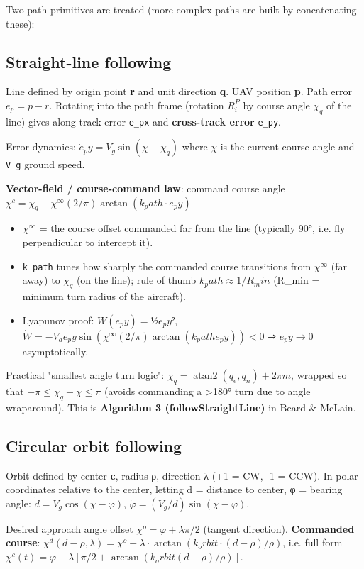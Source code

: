 \documentclass[11pt]{article}
\begin{document}
Two path primitives are treated (more complex paths are built by concatenating these):

\subsection{Straight-line following}
Line defined by origin point \textbf{r} and unit direction \textbf{q}. UAV position \textbf{p}. Path error $e_p = p - r$. Rotating into the path frame (rotation $R_i^P$ by course angle $χ_q$ of the line) gives along-track error \texttt{e\_\allowbreak{}px} and \textbf{cross-track error} \texttt{e\_\allowbreak{}py}.

Error dynamics: $\dot{e}_py = V_g \sin(χ - χ_q)$ where $χ$ is the current course angle and \texttt{V\_\allowbreak{}g} ground speed.

\textbf{Vector-field / course-command law}: command course angle
$χ^c = χ_q - χ^∞ (2/π) \arctan(k_path · e_py)$
\begin{itemize}
\item $χ^∞$ = the course offset commanded far from the line (typically 90°, i.e. fly perpendicular to intercept it).
\item \texttt{k\_\allowbreak{}path} tunes how sharply the commanded course transitions from $χ^∞$ (far away) to $χ_q$ (on the line); rule of thumb $k_path ≈ 1/R_min$ (R\_\allowbreak{}min = minimum turn radius of the aircraft).
\item Lyapunov proof: $W(e_py)=½e_py²$, $\dot{W} = -V_a e_py \sin(χ^∞ (2/π)\arctan(k_path e_py)) < 0$ ⇒ $e_py→0$ asymptotically.
\end{itemize}

Practical "smallest angle turn logic": $χ_q = \operatorname{atan2}(q_e,q_n) + 2πm$, wrapped so that $-π ≤ χ_q-χ ≤ π$ (avoids commanding a >180° turn due to angle wraparound). This is \textbf{Algorithm 3 (followStraightLine)} in Beard \& McLain.

\subsection{Circular orbit following}
Orbit defined by center \textbf{c}, radius ρ, direction λ (+1 = CW, -1 = CCW). In polar coordinates relative to the center, letting d = distance to center, φ = bearing angle:
$\dot{d} = V_g \cos(χ-φ)$, $\dot{φ} = (V_g/d) \sin(χ-φ)$.

Desired approach angle offset $χ^o = φ + λπ/2$ (tangent direction). \textbf{Commanded course}:
$χ^d(d-ρ,λ) = χ^o + λ·\arctan(k_orbit·(d-ρ)/ρ)$, i.e. full form
$χ^c(t) = φ + λ[π/2 + \arctan(k_orbit(d-ρ)/ρ)]$.
\end{document}
